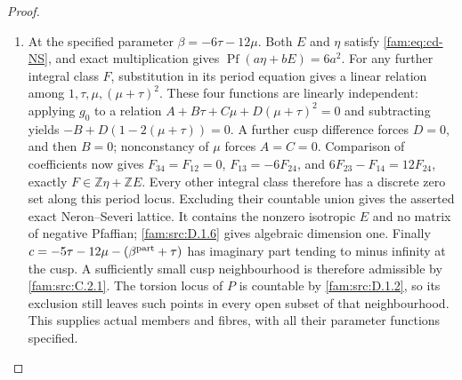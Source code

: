 \begin{proof}
\begin{enumerate}[label=\arabic*.,leftmargin=*]
\item At the specified parameter $\beta=-6\tau-12\mu$. Both $E$ and $\eta$
satisfy \eqref{fam:eq:cd-NS}, and exact multiplication gives
$\operatorname{Pf}(a\eta+bE)=6a^2$.
For any further integral class $F$, substitution in its period equation
gives a linear relation among $1,\tau,\mu,(\mu+\tau)^2$.
These four functions are linearly independent: applying $g_0$ to a
relation $A+B\tau+C\mu+D(\mu+\tau)^2=0$ and subtracting yields
$-B+D(1-2(\mu+\tau))=0$. A further cusp difference forces $D=0$,
and then $B=0$; nonconstancy of $\mu$ forces $A=C=0$.
Comparison of coefficients now gives
$F_{34}=F_{12}=0$, $F_{13}=-6F_{24}$, and
$6F_{23}-F_{14}=12F_{24}$, exactly
$F\in\mathbb Z\eta+\mathbb ZE$. Every other integral class therefore
has a discrete zero set along this period locus. Excluding their
countable union gives the asserted exact Neron--Severi lattice.
It contains the nonzero isotropic $E$ and no matrix of negative
Pfaffian; \ref{fam:src:D.1.6} gives algebraic dimension one.
Finally
$c=-5\tau-12\mu-(\beta^{\rm part}+\tau)$ has imaginary part tending
to minus infinity at the cusp. A sufficiently small cusp neighbourhood
is therefore admissible by \ref{fam:src:C.2.1}. The torsion locus of $P$ is countable
by \ref{fam:src:D.1.2}, so its exclusion still leaves such points in every open subset
of that neighbourhood. This supplies actual members and fibres, with
all their parameter functions specified.
\end{enumerate}
\end{proof}

